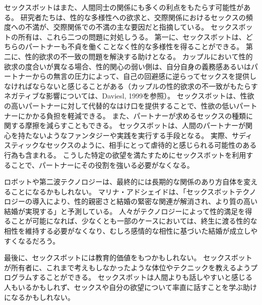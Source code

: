 \documentclass[paper=a4,book,openany]{jlreq}
\begin{document}
セックスボットはまた、人間同士の関係にも多くの利点をもたらす可能性がある。
研究者たちは、性的な多様性への欲求と、交際関係におけるセックスの頻度への不満が、交際関係での不満の主な要因だと指摘している\citep[p.274]{selterman19:_motiv_extrad_infid_revis}。
セックスボットの所有は、これら二つの問題に対処しうる。
第一に、セックスボットは、どちらのパートナーも不貞を働くことなく性的な多様性を得ることができる。
第二に、性的欲求の不一致の問題を解決する助けとなる。
カップルにおいて性的欲求の度合いが異なる場合、性的関心の弱い側は、自分自身の義務感あるいはパートナーからの無言の圧力によって、自己の回避感に逆らってセックスを提供しなければならないと感じることがある（カップルの性的欲求の不一致がもたらすネガティブな影響については、Daviesl, 1999を参照）\nocite{davies99:_sexual_desir_discr}。
セックスボットは、性欲の高いパートナーに対して代替的なはけ口を提供することで、性欲の低いパートナーにかかる負担を軽減できる。
また、パートナーが求めるセックスの種類に関する摩擦を減らすこともできる。
セックスボットは、人間のパートナーが関心を持たないようなファンタジーや実践を実行する手段となる。
実際、サディスティックなセックスのように、相手にとって虐待的と感じられる可能性のある行為も含まれる。
こうした特定の欲望を満たすためにセックスボットを利用することで、パートナーにその役割を強いる必要がなくなる。

ロボットや第二波テクノロジーは、最終的には長期的な関係のあり方自体を変えることになるかもしれない。
マリナ・アドシェイドは、「セックスボットテクノロジーの導入により、性的親密さと結婚の緊密な関連が解消され、より質の高い結婚が実現する」と予測している\citep[p.292]{adshade17:_sexbot_induc_social_chang}。
人々がテクノロジーによって性的満足を得ることが可能になれば、少なくとも一部のケースにおいては、終生に渡る性的な相性を維持する必要がなくなり、むしろ感情的な相性に基づいた結婚が成立しやすくなるだろう。

最後に、セックスボットには教育的価値をもつかもしれない。
セックスボットが所有者に、これまで考えもしなかったような体位やテクニックを教えるようプログラムすることができる。
セックスボットは人間よりも話しやすいと感じる人もいるかもしれず、セックスや自分の欲望について率直に話すことを学ぶ助けになるかもしれない。
\end{document}
